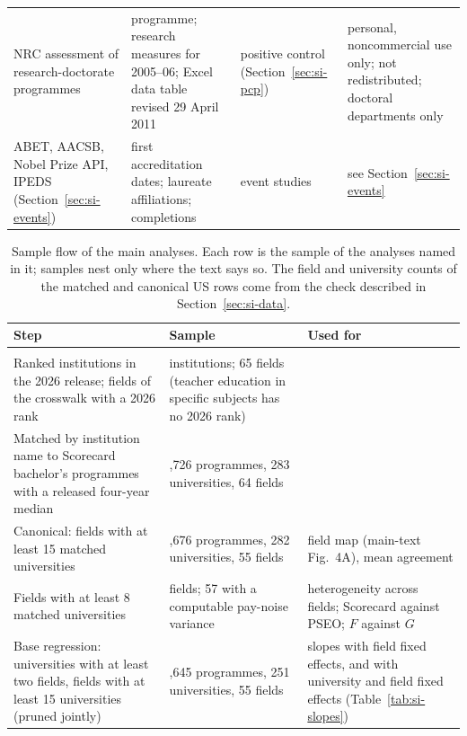 \documentclass[11pt]{article}
\begin{document}
\begin{table}[!htbp]
\begin{tabular}{@{}>{\raggedright\arraybackslash}p{3.0cm}>{\raggedright\arraybackslash}p{3.7cm}>{\raggedright\arraybackslash}p{3.6cm}>{\raggedright\arraybackslash}p{3.9cm}@{}}
NRC assessment of research-doctorate programmes \citep{nrc2011data} & programme; research measures for 2005--06; Excel data table revised 29 April 2011 & positive control (Section~\ref{sec:si-pcp}) & personal, noncommercial use only; not redistributed; doctoral departments only \\
ABET, AACSB, Nobel Prize API, IPEDS (Section~\ref{sec:si-events}) & first accreditation dates; laureate affiliations; completions & event studies & see Section~\ref{sec:si-events} \\
\bottomrule
\end{tabular}
\end{table}

\begin{table}[!htbp]
\centering
\caption{Sample flow of the main analyses. Each row is the sample of the analyses named in it; samples nest only
where the text says so. The field and university counts of the matched and canonical US rows come from the check
described in Section~\ref{sec:si-data}.}\label{tab:si-flow}
\scriptsize
\renewcommand{\arraystretch}{1.1}
\setlength{\tabcolsep}{3pt}
\begin{tabular}{@{}>{\raggedright\arraybackslash}p{6.4cm}>{\raggedright\arraybackslash}p{4.4cm}>{\raggedright\arraybackslash}p{4.6cm}@{}}
\toprule
Step & Sample & Used for \\
\midrule
\multicolumn{3}{@{}l}{\emph{United States}} \\
Ranked institutions in the 2026 release; fields of the crosswalk with a 2026 rank & 368 institutions; 65 fields (teacher education in specific subjects has no 2026 rank) & \\
Matched by institution name to Scorecard bachelor's programmes with a released four-year median & 4,726 programmes, 283 universities, 64 fields & \\
Canonical: fields with at least 15 matched universities & 4,676 programmes, 282 universities, 55 fields & field map (main-text Fig.~4A), mean agreement \\
Fields with at least 8 matched universities & 58 fields; 57 with a computable pay-noise variance & heterogeneity across fields; Scorecard against PSEO; $F$ against $G$ \\
Base regression: universities with at least two fields, fields with at least 15 universities (pruned jointly) & 4,645 programmes, 251 universities, 55 fields & slopes with field fixed effects, and with university and field fixed effects (Table~\ref{tab:si-slopes}) \\

\end{tabular}
\end{table}
\end{document}
